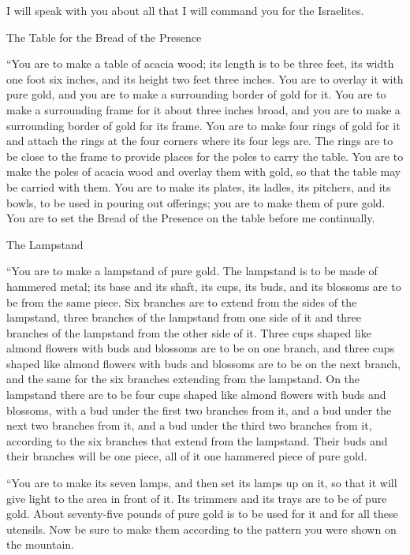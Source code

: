 {I will speak
with you about all
that
I will command
you for the Israelites.
\par }{\SH The Table for the Bread of the Presence
\par }{\PP {}“You are to make
a table
of acacia
wood;
its length
is to be three feet,
its width
one foot six inches,
and its height
two feet three inches.
You are to overlay
it with pure
gold,
and you are
to make
a surrounding
border
of gold
for it.
You are to make
a surrounding
frame
for it about three inches broad,
and you are
to make a surrounding
border
of gold
for its frame.
You are to make
four
rings
of gold
for it and attach
the rings
at the four
corners
where
its four
legs are.
The
rings
are to be
close
to the frame
to provide
places for the poles
to carry
the table.
You are to make
the poles
of acacia
wood
and overlay
them with gold,
so that the table
may be carried with them.
You are to make
its plates,
its ladles,
its pitchers,
and its bowls,
to be used in pouring out
offerings; you are to make
them
of pure
gold.
You are to set
the Bread
of the Presence
on
the table
before
me continually.
\par }{\SH The Lampstand
\par }{\PP {}“You are to make
a lampstand
of pure
gold.
The lampstand
is to be made of hammered
metal;
its base and its shaft,
its cups,
its buds,
and its blossoms
are to be
from
the same piece.
Six
branches
are to extend from
the sides
of the lampstand, three
branches
of the lampstand
from one
side
of it and three
branches
of the lampstand
from the other side of it.
Three
cups
shaped like almond
flowers
with buds
and blossoms
are to be on one
branch, and three
cups
shaped like almond
flowers
with buds
and blossoms
are to be on the next branch, and the same
for the six
branches
extending
from
the lampstand.
On the lampstand
there are to be four
cups
shaped like almond
flowers with buds
and blossoms,
with a bud
under
the first two
branches
from
it, and a bud
under
the next two
branches
from
it, and a bud
under
the third two
branches
from
it, according
to the six
branches
that extend
from
the lampstand.
Their buds
and their branches
will be
one piece,
all
of it one
hammered
piece of pure
gold.
\par }{\PP {}“You are to make
its seven
lamps,
and then set
its lamps
up on
it, so that it will give light
to the area
in front of it.
Its trimmers
and its trays
are to be of pure
gold.
About seventy-five pounds
of pure
gold
is to be used
for it
and for all
these
utensils.
Now be sure
to make
them according to the pattern
you
were shown
on the mountain.


}
